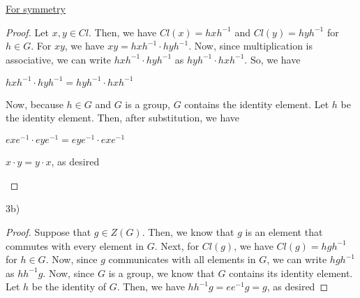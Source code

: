 \documentclass[executivepaper]{article}
\begin{document}
\begin{flushleft}
\begin{center}
\underline{For symmetry}

\begin{proof}

Let $x,y \in Cl$. Then, we have $Cl(x)=hxh^{-1}$ and $Cl(y)=hyh^{-1}$ for $h \in G$. For $xy$, we have $xy=hxh^{-1} \cdot hyh^{-1}$. Now, since multiplication is associative, we can write $hxh^{-1} \cdot hyh^{-1}$ as $hyh^{-1} \cdot hxh^{-1}$. So, we have

\begin{center}

$hxh^{-1} \cdot hyh^{-1}=hyh^{-1} \cdot hxh^{-1}$

\end{center}

Now, because $h \in G$ and $G$ is a group, $G$ contains the identity element. Let $h$ be the identity element. Then, after substitution, we have

\begin{center}

$exe^{-1} \cdot eye^{-1}=eye^{-1} \cdot exe^{-1}$

\vspace{1mm}

$x \cdot y=y \cdot x$, as desired

\end{center}

\end{proof}

\end{center}

\end{flushleft}

\begin{flushleft}

3b)

\begin{center}

\begin{proof}

Suppose that $g \in Z(G)$. Then, we know that $g$ is an element that commutes with every element in $G$. Next, for $Cl(g)$, we have $Cl(g)=hgh^{-1}$ for $h \in G$. Now, since $g$ communicates with all elements in $G$, we can write $hgh^{-1}$ as $hh^{-1}g$. Now, since $G$ is a group, we know that $G$ contains its identity element. Let $h$ be the identity of $G$. Then, we have $hh^{-1}g=ee^{-1}g=g$, as desired

\end{proof}

\end{center}

\end{flushleft}
\end{document}
